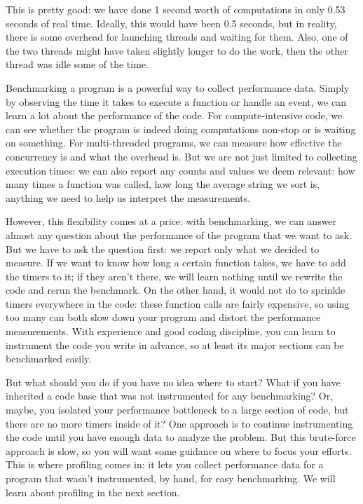 This is pretty good: we have done 1 second worth of computations in only 0.53 seconds of real time. Ideally, this would have been 0.5 seconds, but in reality, there is some overhead for launching threads and waiting for them. Also, one of the two threads might have taken slightly longer to do the work, then the other thread was idle some of the time.

Benchmarking a program is a powerful way to collect performance data. Simply by observing the time it takes to execute a function or handle an event, we can learn a lot about the performance of the code. For compute-intensive code, we can see whether the program is indeed doing computations non-stop or is waiting on something. For multi-threaded programs, we can measure how effective the concurrency is and what the overhead is. But we are not just limited to collecting execution times: we can also report any counts and values we deem relevant: how many times a function was called, how long the average string we sort is, anything we need to help us interpret the measurements.

However, this flexibility comes at a price: with benchmarking, we can answer almost any question about the performance of the program that we want to ask. But we have to ask the question first: we report only what we decided to measure. If we want to know how long a certain function takes, we have to add the timers to it; if they aren't there, we will learn nothing until we rewrite the code and rerun the benchmark. On the other hand, it would not do to sprinkle timers everywhere in the code: these function calls are fairly expensive, so using too many can both slow down your program and distort the performance measurements. With experience and good coding discipline, you can learn to instrument the code you write in advance, so at least its major sections can be benchmarked easily.

But what should you do if you have no idea where to start? What if you have inherited a code base that was not instrumented for any benchmarking? Or, maybe, you isolated your performance bottleneck to a large section of code, but there are no more timers  inside of it? One approach is to continue instrumenting the code until you have enough data to analyze the problem. But this brute-force approach is slow, so you will want some guidance on where to focus your efforts. This is where profiling comes in: it lets you collect performance data for a program that wasn't instrumented, by hand, for easy benchmarking. We will learn about profiling in the next section.






